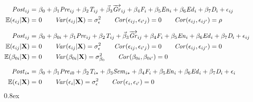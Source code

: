 \documentclass[a0,landscape]{a0poster}
\begin{document}
\begin{multicols}{3}
\begin{align}
\mathit{Post}_{ij} = & ~ \beta_0 
                     + \beta_1 \mathit{Pre}_{ij}
                     + \beta_2 \mathit{T}_{ij}
                     + \vec\beta_{3} \overrightarrow{\mathit{Gr}}_{ij}
                     + \beta_4 \mathit{F}_{i}
                     + \beta_5 \mathit{En}_{i}
                     + \beta_6 \mathit{Ed}_{i}
                     + \beta_7 \mathit{D}_{i}
                     + \epsilon_{ij}
                     \label{eq:model1} \\
\mathbb{E}(\epsilon_{ij} | \mathbf{X} ) = & ~ 0 \nonumber \qquad
\mathit{Var}(\epsilon_{ij} | \mathbf{X} ) = \sigma^2_{\epsilon} \qquad
                    \mathit{Cor}(\epsilon_{ij}, \epsilon_{i'j}) = 0 \qquad
                    \mathit{Cor}(\epsilon_{ij}, \epsilon_{ij'}) = \rho \nonumber \\[1.5ex]
\mathit{Post}_{ij} = & ~ \beta_0 + \beta_{0i}
                     + \beta_1 \mathit{Pre}_{ij}
                     + \beta_2 \mathit{T}_{ij}
                     + \vec\beta_{3} \overrightarrow{\mathit{Gr}}_{ij}
                     + \beta_4 \mathit{F}_{i}
                     + \beta_5 \mathit{En}_{i}
                     + \beta_6 \mathit{Ed}_{i}
                     + \beta_7 \mathit{D}_{i}
                     + \epsilon_{ij}
                     \label{eq:model2} \\
\mathbb{E}(\epsilon_{ij} | \mathbf{X} ) = & ~ 0 \nonumber \qquad
\mathit{Var}(\epsilon_{ij} | \mathbf{X} ) = \sigma^2_{\epsilon} \qquad
                    \mathit{Cor}(\epsilon_{ij}, \epsilon_{i'j}) = 0 \qquad
                    \mathit{Cor}(\epsilon_{ij}, \epsilon_{ij'}) = 0 \nonumber \\
\mathbb{E}(\beta_{0i} | \mathbf{X} ) = & ~ 0 \nonumber \qquad
\mathit{Var}(\beta_{0i} | \mathbf{X} ) = \sigma^2_{\beta_0} \qquad
                    \mathit{Cor}(\beta_{0i}, \beta_{0i'}) = 0 \nonumber \\[1.5ex]
\mathit{Post}_{i*} = & ~ \beta_0
                     + \beta_1 \mathit{Pre}_{i0}
                     + \beta_2 \mathit{T}_{i*}
                     + \beta_3 \mathit{Sem}_{i*}
                     + \beta_4 \mathit{F}_{i}
                     + \beta_5 \mathit{En}_{i}
                     + \beta_6 \mathit{Ed}_{i}
                     + \beta_7 \mathit{D}_{i}
                     + \epsilon_{i}
                     \label{eq:model3} \\
\mathbb{E}(\epsilon_{i} | \mathbf{X} ) = & ~ 0 \nonumber \qquad
\mathit{Var}(\epsilon_{i} | \mathbf{X} ) = \sigma^2_{\epsilon} \qquad
                    \mathit{Cor}(\epsilon_{i}, \epsilon_{i'}) = 0  \nonumber
\end{align} 
\parskip 0.8ex


\end{multicols}
\end{document}
